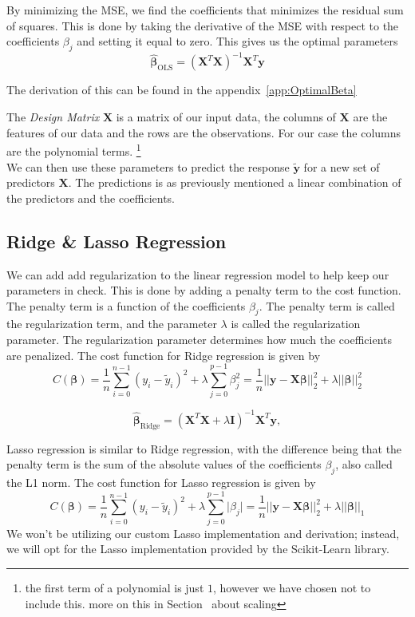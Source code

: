 \documentclass[twoside,11pt]{report}
\begin{document}
By minimizing the MSE, we find the coefficients that minimizes the residual sum of squares. This is done by taking the derivative of the
MSE with respect to the coefficients $\beta_j$ and setting it equal to zero. This gives us the optimal parameters
$$
\hat{\boldsymbol{\beta}}_{\mathrm{OLS}} = \left(\mathbf{X}^T\mathbf{X}\right)^{-1}\mathbf{X}^T\mathbf{y}
$$
\begin{center}
    The derivation of this can be found in the appendix~\ref{app:OptimalBeta} 
\end{center}
The \emph{Design Matrix} $\mathbf{X}$ is a matrix of our input data, the columns of $\mathbf{X}$ are the features of our 
data and the rows are the observations. For our case the columns are the polynomial terms. \footnote{the first
term of a polynomial is just $1$, however we have chosen not to include this. more on this in Section~ 
about scaling}\\ 
We can then use these parameters to predict the response $\tilde{\mathbf{y}}$ for a new set of predictors $\mathbf{X}$.
The predictions is as previously mentioned a linear combination of the predictors and the coefficients.

\subsection{Ridge \& Lasso Regression}
\label{sec:ridge}

We can add add regularization to the linear regression model to help keep our parameters in check. 
This is done by adding a penalty term to the cost function. The penalty term is a function of the coefficients $\beta_j$. 
The penalty term is called the regularization term, and the parameter $\lambda$ is called the regularization parameter. 
The regularization parameter determines how much the coefficients are penalized. The cost function for Ridge regression is given by
$$
C(\mathbf{\beta}) = \frac{1}{n}\sum_{i=0}^{n-1}(y_i-\tilde{y}_i)^2 + \lambda\sum_{j=0}^{p-1}\beta_j^2  
=\frac{1}{n}\vert\vert \mathbf{y}-\mathbf{X}\mathbf{\beta}\vert\vert_2^2 + \lambda\vert\vert\mathbf{\beta}\vert\vert_2^2
$$




$$
\hat{\mathbf{\beta}}_{\mathrm{Ridge}} = \left(\mathbf{X}^T\mathbf{X}+\lambda\mathbf{I}\right)^{-1}\mathbf{X}^T\mathbf{y},
$$


Lasso regression is similar to Ridge regression, with the difference being that the penalty term is the sum of the absolute values of the coefficients $\beta_j$, also called 
the L1 norm. The cost function for Lasso regression is given by
$$
C(\mathbf{\beta}) = \frac{1}{n}\sum_{i=0}^{n-1}(y_i-\tilde{y}_i)^2 + \lambda\sum_{j=0}^{p-1}\vert\beta_j\vert
=\frac{1}{n}\vert\vert \mathbf{y}-\mathbf{X}\mathbf{\beta}\vert\vert_2^2 + \lambda\vert\vert\mathbf{\beta}\vert\vert_1
$$
We won't be utilizing our custom Lasso implementation and derivation; instead, 
we will opt for the Lasso implementation provided by the Scikit-Learn library.
\end{document}
